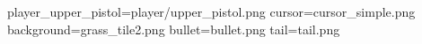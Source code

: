 player_upper_pistol=player/upper_pistol.png
cursor=cursor_simple.png
background=grass_tile2.png
bullet=bullet.png
tail=tail.png
